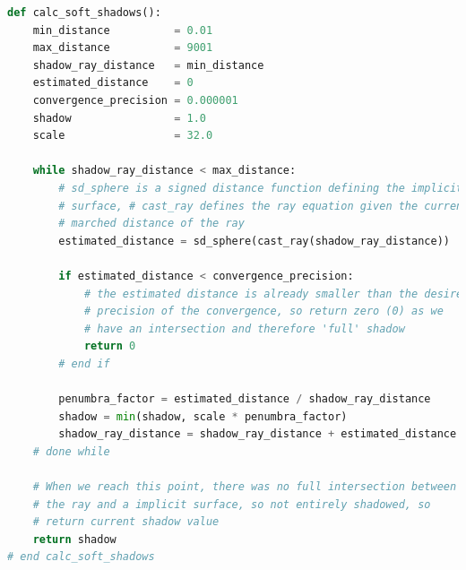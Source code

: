 \begin{minipage}{\linewidth}
\begin{lstlisting}[language=Python,caption={Algorithmus zur Berechnung
        von weichen Schatten.},label={alg:sphere_tracing_soft_shadows},captionpos=b,emph={calc_soft_shadows}]
def calc_soft_shadows():
    min_distance          = 0.01
    max_distance          = 9001
    shadow_ray_distance   = min_distance
    estimated_distance    = 0
    convergence_precision = 0.000001
    shadow                = 1.0
    scale                 = 32.0

    while shadow_ray_distance < max_distance:
        # sd_sphere is a signed distance function defining the implicit
        # surface, # cast_ray defines the ray equation given the current travelled /
        # marched distance of the ray
        estimated_distance = sd_sphere(cast_ray(shadow_ray_distance))

        if estimated_distance < convergence_precision:
            # the estimated distance is already smaller than the desired
            # precision of the convergence, so return zero (0) as we
            # have an intersection and therefore 'full' shadow
            return 0
        # end if

        penumbra_factor = estimated_distance / shadow_ray_distance
        shadow = min(shadow, scale * penumbra_factor)
        shadow_ray_distance = shadow_ray_distance + estimated_distance
    # done while

    # When we reach this point, there was no full intersection between
    # the ray and a implicit surface, so not entirely shadowed, so
    # return current shadow value
    return shadow
# end calc_soft_shadows
\end{lstlisting}
\end{minipage}
